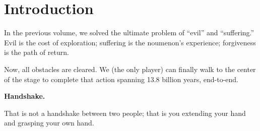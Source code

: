 \section{Introduction}

In the previous volume, we solved the ultimate problem of ``evil'' and ``suffering.'' Evil is the cost of exploration; suffering is the noumenon's experience; forgiveness is the path of return.

Now, all obstacles are cleared. We (the only player) can finally walk to the center of the stage to complete that action spanning 13.8 billion years, end-to-end.

\textbf{Handshake.}

That is not a handshake between two people; that is you extending your hand and grasping your own hand.

